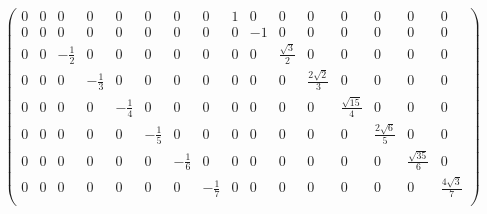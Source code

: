 \documentclass[12pt]{extarticle}
\begin{document}
\begin{small}
\[\begin{pmatrix}
0 &  0 & 0                   & 0                   & 0                   & 0                   & 0                   & 0                   & 1 & 0  & 0                  & 0                   & 0                   & 0                   & 0                   & 0 \\
0 &  0 & 0                   & 0                   & 0                   & 0                   & 0                   & 0                   & 0 & -1 & 0                  & 0                   & 0                   & 0                   & 0                   & 0 \\
0 &  0 & -\frac{1}{2}        & 0                   & 0                   & 0                   & 0                   & 0                   & 0 & 0  & \frac{\sqrt{3}}{2} & 0                   & 0                   & 0                   & 0                   & 0 \\
0 &  0 & 0                   & -\frac{1}{3}        & 0                   & 0                   & 0                   & 0                   & 0 & 0  & 0                  & \frac{2\sqrt{2}}{3} & 0                   & 0                   & 0                   & 0 \\
0 &  0 & 0                   & 0                   & -\frac{1}{4}        & 0                   & 0                   & 0                   & 0 & 0  & 0                  & 0                   & \frac{\sqrt{15}}{4} & 0                   & 0                   & 0 \\
0 &  0 & 0                   & 0                   & 0                   & -\frac{1}{5}        & 0                   & 0                   & 0 & 0  & 0                  & 0                   & 0                   & \frac{2\sqrt{6}}{5} & 0                   & 0 \\
0 &  0 & 0                   & 0                   & 0                   & 0                   & -\frac{1}{6}        & 0                   & 0 & 0  & 0                  & 0                   & 0                   & 0                   & \frac{\sqrt{35}}{6} & 0 \\
0 &  0 & 0                   & 0                   & 0                   & 0                   & 0                   & -\frac{1}{7}        & 0 & 0  & 0                  & 0                   & 0                   & 0                   & 0                   & \frac{4\sqrt{3}}{7} \\
\end{pmatrix}
\]
\end{small}
\end{document}
